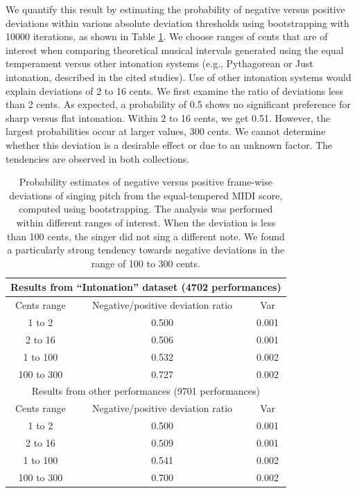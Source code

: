 We quantify this result by estimating the probability of negative versus positive deviations within various absolute deviation thresholds using bootstrapping \cite{efron1994introduction} with 10000 iterations, as shown in Table \ref{table:1}. We choose ranges of cents that are of interest when comparing theoretical musical intervals generated using the equal temperament versus other intonation systems (e.g., Pythagorean or Just intonation, described in the cited studies). Use of other intonation systems would explain deviations of 2 to 16 cents. We first examine the ratio of deviations less than 2 cents. As expected, a probability of 0.5 shows no significant preference for sharp versus flat intonation. Within 2 to 16 cents, we get 0.51. However, the largest probabilities occur at larger values, 300 cents. We cannot determine whether this deviation is a desirable effect or due to an unknown factor. The tendencies are observed in both collections. 


\begin{table}[t!]
\centering
\begin{tabular}{ |c|c|c| } 
\hline
\multicolumn{3}{|c|}{Results from ``Intonation'' dataset (4702 performances)}\\
\hline\hline
Cents range & Negative/positive deviation ratio & Var \\
\hline
1 to 2 & 0.500 & 0.001 \\ 
2 to 16 & 0.506 & 0.001 \\ 
1 to 100 & 0.532 & 0.002\\ 
100 to 300 & 0.727 & 0.002\\ 
\hline\hline
\multicolumn{3}{|c|}{Results from other performances (9701 performances)}\\
\hline\hline
Cents range & Negative/positive deviation ratio & Var \\
\hline
1 to 2 & 0.500 & 0.001 \\ 
2 to 16 & 0.509 & 0.001 \\ 
1 to 100 & 0.541 & 0.002\\ 
100 to 300 & 0.700 & 0.002\\ 
\hline
\end{tabular}
\caption{Probability estimates of negative versus positive frame-wise deviations of singing pitch from the equal-tempered MIDI score, computed using bootstrapping. The analysis was performed within different ranges of interest. When the deviation is less than 100 cents, the singer did not sing a different note. We found a particularly strong tendency towards negative deviations in the range of 100 to 300 cents.}
\label{table:1}
\end{table}


